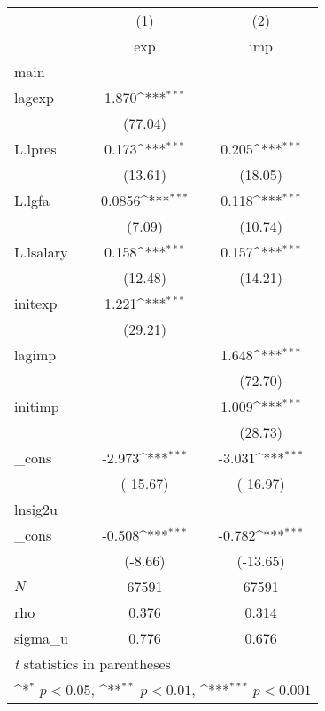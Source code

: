 {
\def\sym#1{\ifmmode^{#1}\else\(^{#1}\)\fi}
\begin{tabular}{l*{2}{c}}
\hline\hline
            &\multicolumn{1}{c}{(1)}&\multicolumn{1}{c}{(2)}\\
            &\multicolumn{1}{c}{exp}&\multicolumn{1}{c}{imp}\\
\hline
main        &                     &                     \\
lagexp      &       1.870\sym{***}&                     \\
            &     (77.04)         &                     \\
[1em]
L.lpres     &       0.173\sym{***}&       0.205\sym{***}\\
            &     (13.61)         &     (18.05)         \\
[1em]
L.lgfa      &      0.0856\sym{***}&       0.118\sym{***}\\
            &      (7.09)         &     (10.74)         \\
[1em]
L.lsalary   &       0.158\sym{***}&       0.157\sym{***}\\
            &     (12.48)         &     (14.21)         \\
[1em]
initexp     &       1.221\sym{***}&                     \\
            &     (29.21)         &                     \\
[1em]
lagimp      &                     &       1.648\sym{***}\\
            &                     &     (72.70)         \\
[1em]
initimp     &                     &       1.009\sym{***}\\
            &                     &     (28.73)         \\
[1em]
\_cons      &      -2.973\sym{***}&      -3.031\sym{***}\\
            &    (-15.67)         &    (-16.97)         \\
\hline
lnsig2u     &                     &                     \\
\_cons      &      -0.508\sym{***}&      -0.782\sym{***}\\
            &     (-8.66)         &    (-13.65)         \\
\hline
\(N\)       &       67591         &       67591         \\
rho         &       0.376         &       0.314         \\
sigma\_u     &       0.776         &       0.676         \\
\hline\hline
\multicolumn{3}{l}{\footnotesize \textit{t} statistics in parentheses}\\
\multicolumn{3}{l}{\footnotesize \sym{*} \(p<0.05\), \sym{**} \(p<0.01\), \sym{***} \(p<0.001\)}\\
\end{tabular}
}
